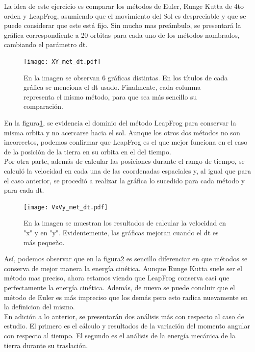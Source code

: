 \documentclass{article}
\begin{document}
La idea de este ejercicio es comparar los métodos de Euler, Runge Kutta de 4to orden y LeapFrog, asumiendo que el movimiento del Sol es despreciable y que se puede considerar que este está fijo. Sin mucho mas preámbulo, se presentará la gráfica correspondiente a 20 orbitas para cada uno de los métodos nombrados, cambiando el parámetro dt. 


\begin{figure}[H]
    \centering
    \texttt{[image: XY\_met\_dt.pdf]}
    \caption{En la imagen se observan 6 gráficas distintas. En los títulos de cada gráfica se menciona el dt usado. Finalmente, cada columna representa el mismo método, para que sea más sencillo su comparación.}
    \label{fig:pos}
\end{figure}

En la figura\ref{fig:pos}, se evidencia el dominio del método LeapFrog para conservar la misma orbita y no acercarse hacia el sol. Aunque los otros dos métodos no son incorrectos, podemos confirmar que LeapFrog es el que mejor funciona en el caso de la posición de la tierra en su orbita en el del tiempo.\\   

Por otra parte, además de calcular las posiciones durante el rango de tiempo, se calculó la velocidad en cada una de las coordenadas espaciales y, al igual que para el caso anterior, se procedió a realizar la gráfica lo sucedido para cada método y para cada dt.  

\begin{figure}[H]
    \centering
    \texttt{[image: VxVy\_met\_dt.pdf]}
    \caption{En la imagen se muestran los resultados de calcular la velocidad en "x" y en "y". Evidentemente, las gráficas mejoran cuando el dt es más pequeño.}
    \label{fig:vel}
\end{figure}

Así, podemos observar que en la figura\ref{fig:vel} es sencillo diferenciar en que métodos se conserva de mejor manera la energía cinética. Aunque Runge Kutta suele ser el método mas preciso, ahora estamos viendo que LeapFrog conserva casi que perfectamente la energía cinética. Además, de nuevo se puede concluir que el método de Euler es más impreciso que los demás pero esto radica nuevamente en la definicion del mismo.\\

En adición a lo anterior, se presentarán dos análisis más con respecto al caso de estudio. El primero es el cálculo y resultados de la variación del momento angular con respecto al tiempo. El segundo es el análisis de la energía mecánica de la tierra durante su traslación. 
\end{document}
